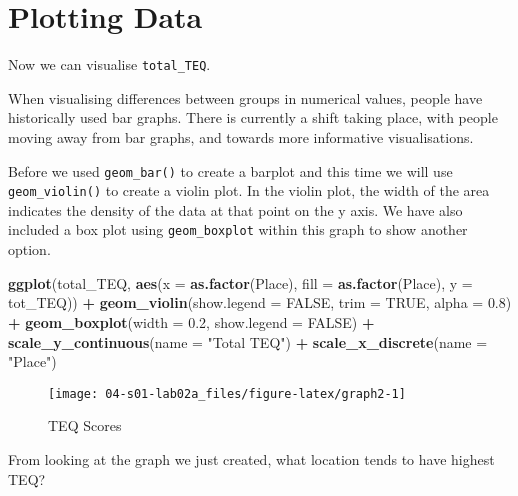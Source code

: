 \documentclass[]{book}
\newenvironment{Shaded}{\begin{snugshade}}{\end{snugshade}}
\newcommand{\DataTypeTok}[1]{\textcolor[rgb]{0.13,0.29,0.53}{#1}}
\newcommand{\FloatTok}[1]{\textcolor[rgb]{0.00,0.00,0.81}{#1}}
\newcommand{\KeywordTok}[1]{\textcolor[rgb]{0.13,0.29,0.53}{\textbf{#1}}}
\newcommand{\NormalTok}[1]{#1}
\newcommand{\OperatorTok}[1]{\textcolor[rgb]{0.81,0.36,0.00}{\textbf{#1}}}
\newcommand{\OtherTok}[1]{\textcolor[rgb]{0.56,0.35,0.01}{#1}}
\newcommand{\StringTok}[1]{\textcolor[rgb]{0.31,0.60,0.02}{#1}}
\begin{document}
\hypertarget{plotting-data}{%
\section{Plotting Data}\label{plotting-data}}

Now we can visualise \texttt{total\_TEQ}.

When visualising differences between groups in numerical values, people have historically used bar graphs. There is currently a shift taking place, with people moving away from bar graphs, and towards more informative visualisations.

Before we used \texttt{geom\_bar()} to create a barplot and this time we will use \texttt{geom\_violin()} to create a violin plot. In the violin plot, the width of the area indicates the density of the data at that point on the y axis. We have also included a box plot using \texttt{geom\_boxplot} within this graph to show another option.

\begin{Shaded}
\begin{Highlighting}[]
\KeywordTok{ggplot}\NormalTok{(total_TEQ, }\KeywordTok{aes}\NormalTok{(}\DataTypeTok{x =} \KeywordTok{as.factor}\NormalTok{(Place), }\DataTypeTok{fill =} \KeywordTok{as.factor}\NormalTok{(Place), }\DataTypeTok{y =}\NormalTok{ tot_TEQ)) }\OperatorTok{+}\StringTok{ }\KeywordTok{geom_violin}\NormalTok{(}\DataTypeTok{show.legend =} \OtherTok{FALSE}\NormalTok{, }\DataTypeTok{trim =} \OtherTok{TRUE}\NormalTok{, }\DataTypeTok{alpha =} \FloatTok{0.8}\NormalTok{) }\OperatorTok{+}
\StringTok{  }\KeywordTok{geom_boxplot}\NormalTok{(}\DataTypeTok{width =} \FloatTok{0.2}\NormalTok{, }\DataTypeTok{show.legend =} \OtherTok{FALSE}\NormalTok{) }\OperatorTok{+}
\StringTok{  }\KeywordTok{scale_y_continuous}\NormalTok{(}\DataTypeTok{name =} \StringTok{"Total TEQ"}\NormalTok{) }\OperatorTok{+}
\StringTok{  }\KeywordTok{scale_x_discrete}\NormalTok{(}\DataTypeTok{name =} \StringTok{"Place"}\NormalTok{)}
\end{Highlighting}
\end{Shaded}

\begin{figure}

{\centering \texttt{[image: 04-s01-lab02a\_files/figure-latex/graph2-1]} 

}

\caption{TEQ Scores}\label{fig:graph2}
\end{figure}

From looking at the graph we just created, what location tends to have highest TEQ?
\end{document}

